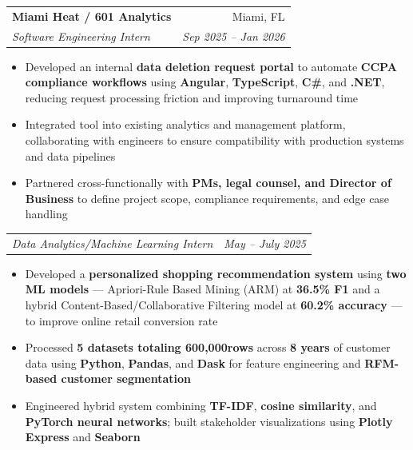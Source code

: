 \documentclass[letterpaper,11pt]{article}
\makeatletter
\newcommand{\resumeItem}[1]{
  \item\small{
    {#1 \vspace{-2pt}}
  }
}
\newcommand{\resumeSubheading}[4]{
  \vspace{-2pt}\item
    \begin{tabular*}{0.97\textwidth}[t]{l@{\extracolsep{\fill}}r}
      \textbf{#1} & #2 \\
      \textit{\small#3} & \textit{\small #4} \\
    \end{tabular*}\vspace{-7pt}
}
\newcommand{\resumeSubSubheading}[2]{
    \item
    \begin{tabular*}{0.97\textwidth}{l@{\extracolsep{\fill}}r}
      \textit{\small#1} & \textit{\small #2} \\
    \end{tabular*}\vspace{-7pt}
}
\newcommand{\resumeItemListStart}{\begin{itemize}}
\newcommand{\resumeItemListEnd}{\end{itemize}\vspace{-5pt}}
\newcommand{\plus}{{\raisebox{0.25ex}{+}}}
\makeatother
\begin{document}
        


    \resumeSubheading
      {Miami Heat / 601 Analytics}{Miami, FL}
      {Software Engineering Intern}{Sep 2025 -- Jan 2026}
      \resumeItemListStart
        \resumeItem{Developed an internal \textbf{data deletion request portal} to automate \textbf{CCPA compliance workflows} using \textbf{Angular}, \textbf{TypeScript}, \textbf{C\#}, and \textbf{.NET}, reducing request processing friction and improving turnaround time}
        
        \resumeItem{Integrated tool into existing analytics and management platform, collaborating with engineers to ensure compatibility with production systems and data pipelines}
        
        \resumeItem{Partnered cross-functionally with \textbf{PMs, legal counsel, and Director of Business} to define project scope, compliance requirements, and edge case handling}
      \resumeItemListEnd

    \resumeSubSubheading
      {Data Analytics/Machine Learning Intern}{May -- July 2025}
      \resumeItemListStart
        \resumeItem{Developed a \textbf{personalized shopping recommendation system} using \textbf{two ML models} --- Apriori-Rule Based Mining (ARM) at \textbf{36.5\% F1} and a hybrid Content-Based/Collaborative Filtering model at \textbf{60.2\% accuracy} --- to improve online retail conversion rate}
        
        \resumeItem{Processed \textbf{5 datasets totaling 600,000\plus rows} across \textbf{8 years} of customer data using \textbf{Python}, \textbf{Pandas}, and \textbf{Dask} for feature engineering and \textbf{RFM-based customer segmentation}}
        
        \resumeItem{Engineered hybrid system combining \textbf{TF-IDF}, \textbf{cosine similarity}, and \textbf{PyTorch neural networks}; built stakeholder visualizations using \textbf{Plotly Express} and \textbf{Seaborn}}
      \resumeItemListEnd
\end{document}
